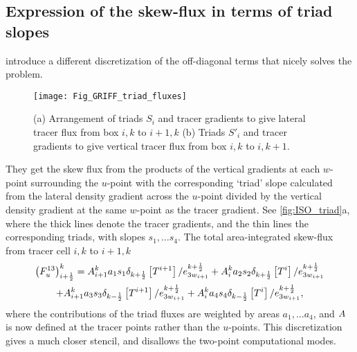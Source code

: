 \documentclass[../tex_main/NEMO_manual]{subfiles}
\begin{document}
\subsection{Expression of the skew-flux in terms of triad slopes}
\citep{Griffies_al_JPO98} introduce a different discretization of the
off-diagonal terms that nicely solves the problem.
\begin{figure}[tb] \begin{center}
    \texttt{[image: Fig\_GRIFF\_triad\_fluxes]}
    \caption{ \protect\label{fig:ISO_triad}
      (a) Arrangement of triads $S_i$ and tracer gradients to
           give lateral tracer flux from box $i,k$ to $i+1,k$
      (b) Triads $S'_i$ and tracer gradients to give vertical tracer flux from
            box $i,k$ to $i,k+1$.}
 \end{center} \end{figure}
They get the skew flux from the products of the vertical gradients at
each $w$-point surrounding the $u$-point with the corresponding `triad'
slope calculated from the lateral density gradient across the $u$-point
divided by the vertical density gradient at the same $w$-point as the
tracer gradient. See \autoref{fig:ISO_triad}a, where the thick lines
denote the tracer gradients, and the thin lines the corresponding
triads, with slopes $s_1, \dotsc s_4$. The total area-integrated
skew-flux from tracer cell $i,k$ to $i+1,k$
\begin{multline}
  \label{eq:i13}
  \left( F_u^{13}  \right)_{i+\frac{1}{2}}^k = {A}_{i+1}^k a_1 s_1
  \delta _{k+\frac{1}{2}} \left[ T^{i+1}
  \right]/e_{{3w}_{i+1}}^{k+\frac{1}{2}}  + {A} _i^k a_2 s_2 \delta
  _{k+\frac{1}{2}} \left[ T^i
  \right]/e_{{3w}_{i+1}}^{k+\frac{1}{2}} \\
   +{A} _{i+1}^k a_3 s_3 \delta _{k-\frac{1}{2}} \left[ T^{i+1}
  \right]/e_{{3w}_{i+1}}^{k+\frac{1}{2}}  +{A} _i^k a_4 s_4 \delta
  _{k-\frac{1}{2}} \left[ T^i \right]/e_{{3w}_{i+1}}^{k+\frac{1}{2}},
\end{multline}
where the contributions of the triad fluxes are weighted by areas
$a_1, \dotsc a_4$, and ${A}$ is now defined at the tracer points
rather than the $u$-points. This discretization gives a much closer
stencil, and disallows the two-point computational modes.
\end{document}
